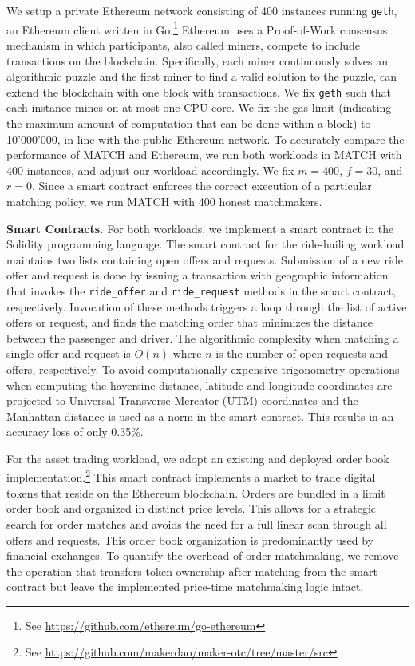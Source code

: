 We setup a private Ethereum network consisting of 400 instances running \texttt{geth}, an Ethereum client written in Go.\footnote{See \url{https://github.com/ethereum/go-ethereum}}
Ethereum uses a Proof-of-Work consensus mechanism in which participants, also called miners, compete to include transactions on the blockchain.
Specifically, each miner continuously solves an algorithmic puzzle and the first miner to find a valid solution to the puzzle, can extend the blockchain with one block with transactions.
We fix \texttt{geth} such that each instance mines on at most one CPU core.
We fix the gas limit (indicating the maximum amount of computation that can be done within a block) to 10'000'000, in line with the public Ethereum network.
To accurately compare the performance of MATCH and Ethereum, we run both workloads in MATCH with 400 instances, and adjust our workload accordingly.
We fix $ m = 400 $, $ f = 30 $, and $ r = 0 $.
Since a smart contract enforces the correct execution of a particular matching policy, we run MATCH with 400 honest matchmakers.

\textbf{Smart Contracts.}
For both workloads, we implement a smart contract in the Solidity programming language.
The smart contract for the ride-hailing workload maintains two lists containing open offers and requests.
Submission of a new ride offer and request is done by issuing a transaction with geographic information that invokes the \texttt{ride\_offer} and \texttt{ride\_request} methods in the smart contract, respectively.
Invocation of these methods triggers a loop through the list of active offers or request, and finds the matching order that minimizes the distance between the passenger and driver.
The algorithmic complexity when matching a single offer and request is $ O(n) $ where $ n $ is the number of open requests and offers, respectively.
To avoid computationally expensive trigonometry operations when computing the haversine distance, latitude and longitude coordinates are projected to Universal Transverse Mercator (UTM) coordinates and the Manhattan distance is used as a norm in the smart contract.
This results in an accuracy loss of only 0.35\%.

For the asset trading workload, we adopt an existing and deployed order book implementation.\footnote{See \url{https://github.com/makerdao/maker-otc/tree/master/src}}
This smart contract implements a market to trade digital tokens that reside on the Ethereum blockchain.
Orders are bundled in a limit order book and organized in distinct price levels.
This allows for a strategic search for order matches and avoids the need for a full linear scan through all offers and requests.
This order book organization is predominantly used by financial exchanges.
To quantify the overhead of order matchmaking, we remove the operation that transfers token ownership after matching from the smart contract but leave the implemented price-time matchmaking logic intact.

